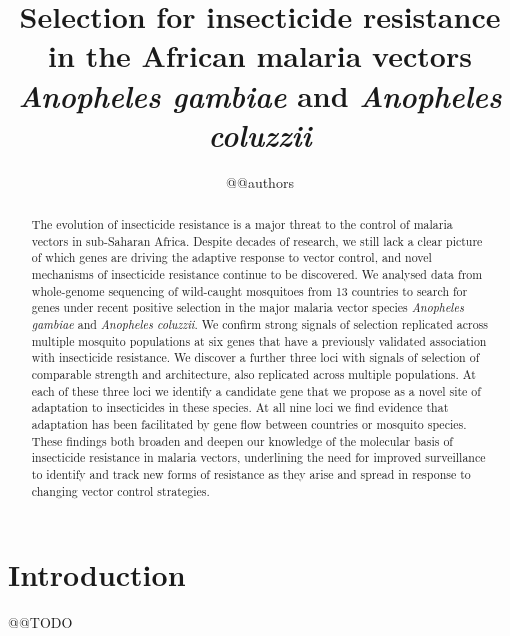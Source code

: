 \documentclass[a4paper,11pt,abstracton,hidelinks]{scrartcl}
\title{
Selection for insecticide resistance in the African malaria vectors \textit{Anopheles gambiae} and \textit{Anopheles coluzzii}
}
\author{@@authors}
\begin{document}
\maketitle


\begin{abstract}

%
The evolution of insecticide resistance is a major threat to the control of malaria vectors in sub-Saharan Africa.
%
Despite decades of research, we still lack a clear picture of which genes are driving the adaptive response to vector control, and novel mechanisms of insecticide resistance continue to be discovered.
%
We analysed data from whole-genome sequencing of wild-caught mosquitoes from 13 countries to search for genes under recent positive selection in the major malaria vector species \textit{Anopheles gambiae} and \textit{Anopheles coluzzii}.
%
We confirm strong signals of selection replicated across multiple mosquito populations at six genes that have a previously validated association with insecticide resistance.
%
We discover a further three loci with signals of selection of comparable strength and architecture, also replicated across multiple populations.
%
At each of these three loci we identify a candidate gene that we propose as a novel site of adaptation to insecticides in these species.
%
At all nine loci we find evidence that adaptation has been facilitated by gene flow between countries or mosquito species.
%
These findings both broaden and deepen our knowledge of the molecular basis of insecticide resistance in malaria vectors, underlining the need for improved surveillance to identify and track new forms of resistance as they arise and spread in response to changing vector control strategies.
%

\end{abstract}


\section*{Introduction}

@@TODO


\end{document}
